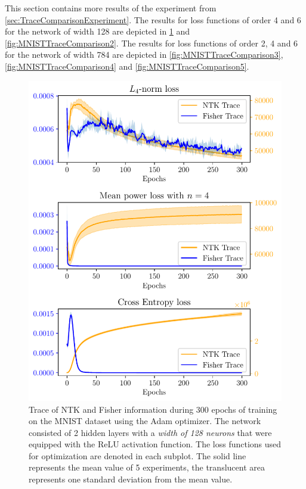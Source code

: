 This section contains more results of the experiment from \cref{sec:TraceComparisonExperiment}. The results for loss functions of order 4 and 6 for the network of width 128 are depicted in \cref{fig:MNISTTraceComparison1} and \cref{fig:MNISTTraceComparison2}. The results for loss functions of order 2, 4 and 6 for the network of width 784 are depicted in \cref{fig:MNISTTraceComparison3}, \cref{fig:MNISTTraceComparison4} and \cref{fig:MNISTTraceComparison5}.

\begin{figure}
	\centering
	\includegraphics{text/results/FisherNTKComparisonPlots/Triple_comparison_losses4_128.pdf}
	\caption{Trace of NTK and Fisher information during 300 epochs of training on the MNIST dataset using the Adam optimizer. The network consisted of 2 hidden layers with a \emph{width of 128 neurons} that were equipped with the ReLU activation function. The loss functions used for optimization are denoted in each subplot. The solid line represents the mean value of 5 experiments, the translucent area represents one standard deviation from the mean value.}
	\label{fig:MNISTTraceComparison1}
\end{figure}
